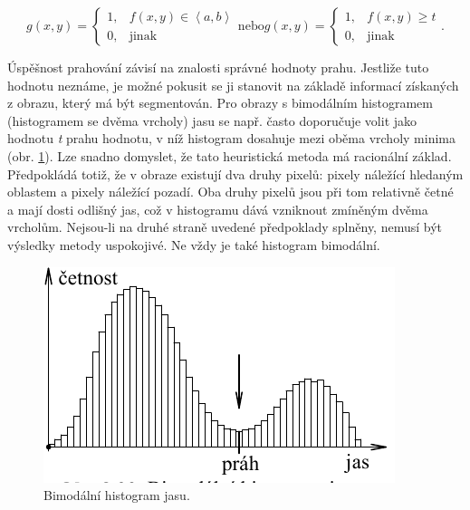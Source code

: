 \begin{equation} \label{eq:8_68}
    g\left(x,y\right) = \left\{
    \begin{array}{cc}
    1, & f\left(x,y\right) \in \left\langle a,b \right\rangle \\
    0, & \mathrm{jinak}
    \end{array}\right.
    \mathrm{nebo}
    g\left(x,y\right) = \left\{
    \begin{array}{cc}
    1, & f\left(x,y\right) \ge t \\
    0, & \mathrm{jinak}
    \end{array}\right. .
\end{equation}

Úspěšnost prahování závisí na znalosti správné hodnoty prahu. Jestliže tuto hodnotu neznáme, je možné pokusit se ji stanovit na základě informací získaných z obrazu, který má být segmentován. Pro obrazy s bimodálním histogramem (histogramem se dvěma vrcholy) jasu se např. často doporučuje volit jako hodnotu \textit{t} prahu hodnotu, v níž histogram dosahuje mezi oběma vrcholy minima (obr. \ref{img:8_22}). Lze snadno domyslet, že tato heuristická metoda má racionální základ. Předpokládá totiž, že v obraze existují dva druhy pixelů: pixely náležící hledaným oblastem a pixely náležící pozadí. Oba druhy pixelů jsou při tom relativně četné a mají dosti odlišný jas, což v histogramu dává vzniknout zmíněným dvěma vrcholům. Nejsou-li na druhé straně uvedené předpoklady splněny, nemusí být výsledky metody uspokojivé. Ne vždy je také histogram bimodální.

\begin{figure}[th]
    \begin{center}
        \includegraphics[scale=0.9]{08_segmentace/images/img_8_22.pdf}
    \end{center}
    \caption{Bimodální histogram jasu.}
    \label{img:8_22}
\end{figure}


